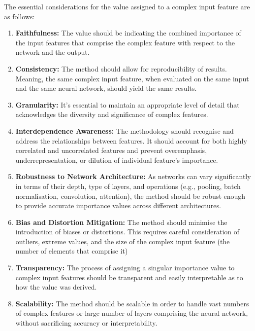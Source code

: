 \begin{Desideratum}

    The essential considerations for the value assigned to a complex input feature are as follows:
\begin{enumerate}
    \item \textbf{Faithfulness:} The value should be indicating the combined importance of the input features that comprise the complex feature with respect to the network and the output.
    \item \textbf{Consistency:} The method should allow for reproducibility of results. Meaning, the same complex input feature, when evaluated on the same input and the same neural network, should yield the same results.
    \item \textbf{Granularity:} It's essential to maintain an appropriate level of detail that acknowledges the diversity and significance of complex features. 
    \item \textbf{Interdependence Awareness:} The methodology should recognise and address the relationships between features. It should account for both highly correlated and uncorrelated features and prevent overemphasis, underrepresentation, or dilution of individual feature's importance.
    \item \textbf{Robustness to Network Architecture:} As networks can vary significantly in terms of their depth, type of layers, and operations (e.g., pooling, batch normalisation, convolution, attention), the method should be robust enough to provide accurate importance values across different architectures.
    \item \textbf{Bias and Distortion Mitigation:} The method should minimise the introduction of biases or distortions. This requires careful consideration of outliers, extreme values, and the size of the complex input feature (\ie the number of elements that comprise it)
    \item \textbf{Transparency:} The process of assigning a singular importance value to complex input features should be transparent and easily interpretable as to how the value was derived.
    \item \textbf{Scalability:} The method should be scalable in order to handle vast numbers of complex features or large number of layers comprising the neural network, without sacrificing accuracy or interpretability.

\end{enumerate}  





\end{Desideratum}

